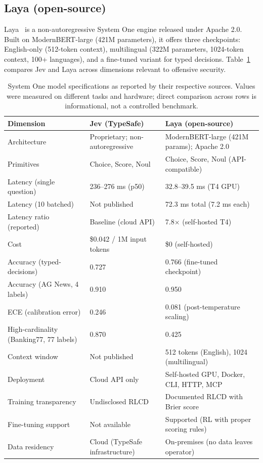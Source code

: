 \documentclass[conference]{IEEEtran}
\begin{document}
\subsection{Laya (open-source)}

Laya~\cite{laya2026} is a non-autoregressive System One engine released under Apache 2.0. Built on ModernBERT-large (421M parameters), it offers three checkpoints: English-only (512-token context), multilingual (322M parameters, 1024-token context, 100+ languages), and a fine-tuned variant for typed decisions. Table~\ref{tab:comparison} compares Jev and Laya across dimensions relevant to offensive security.

\begin{table}[t]
\centering
\caption{System One model specifications as reported by their respective sources. Values were measured on different tasks and hardware; direct comparison across rows is informational, not a controlled benchmark.}
\label{tab:comparison}
\small
\begin{tabular}{@{}lll@{}}
\toprule
\textbf{Dimension} & \textbf{Jev (TypeSafe)} & \textbf{Laya (open-source)} \\
\midrule
Architecture & Proprietary; non-autoregressive & ModernBERT-large (421M params); Apache 2.0 \\
Primitives & Choice, Score, Noul & Choice, Score, Noul (API-compatible) \\
Latency (single question) & 236--276 ms (p50) & 32.8--39.5 ms (T4 GPU) \\
Latency (10 batched) & Not published & 72.3 ms total (7.2 ms each) \\
Latency ratio (reported) & Baseline (cloud API) & 7.8$\times$ (self-hosted T4) \\
Cost & \$0.042 / 1M input tokens & \$0 (self-hosted) \\
Accuracy (typed-decisions) & 0.727 & 0.766 (fine-tuned checkpoint) \\
Accuracy (AG News, 4 labels) & 0.910 & 0.950 \\
ECE (calibration error) & 0.246 & 0.081 (post-temperature scaling) \\
High-cardinality (Banking77, 77 labels) & 0.870 & 0.425 \\
Context window & Not published & 512 tokens (English), 1024 (multilingual) \\
Deployment & Cloud API only & Self-hosted GPU, Docker, CLI, HTTP, MCP \\
Training transparency & Undisclosed RLCD & Documented RLCD with Brier score \\
Fine-tuning support & Not available & Supported (RL with proper scoring rules) \\
Data residency & Cloud (TypeSafe infrastructure) & On-premises (no data leaves operator) \\
\bottomrule
\end{tabular}
\end{table}
\end{document}
